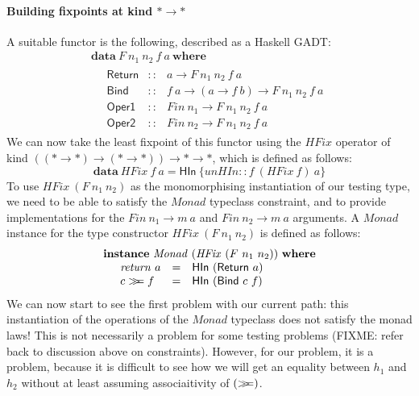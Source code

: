 \documentclass{llncs}
\newcommand{\mbind}{\mathrel{>\kern-0.45em>\kern-0.45em=}}
\begin{document}
\paragraph{Building fixpoints at kind $* \to *$} A suitable functor is
the following, described as a Haskell GADT:
\begin{displaymath}
  \begin{array}{l}
    \mathbf{data}~F~n_1~n_2~f~a~\mathbf{where} \\
    \quad
    \begin{array}{lcl}
      \mathsf{Return}&::&a \to F~n_1~n_2~f~a \\
      \mathsf{Bind}  &::&f~a \to (a \to f~b) \to F~n_1~n_2~f~a \\
      \mathsf{Oper1} &::&\mathit{Fin}~n_1 \to F~n_1~n_2~f~a \\
      \mathsf{Oper2} &::&\mathit{Fin}~n_2 \to F~n_1~n_2~f~a
    \end{array}
  \end{array}
\end{displaymath}
We can now take the least fixpoint of this functor using the
$\mathit{HFix}$ operator of kind
$((* \to *) \to (* \to *)) \to * \to *$, which is defined as follows:
\begin{displaymath}
  \mathbf{data}~\mathit{HFix}~f~a = \mathsf{HIn}~\{ \mathit{unHIn} :: f~(\mathit{HFix}~f)~a \}
\end{displaymath}
To use $\mathit{HFix}~(F~n_1~n_2)$ as the monomorphising instantiation
of our testing type, we need to be able to satisfy the
$\mathit{Monad}$ typeclass constraint, and to provide implementations
for the $\mathit{Fin}~n_1 \to m~a$ and $\mathit{Fin}~n_2 \to m~a$
arguments. A $\mathit{Monad}$ instance for the type constructor
$\mathit{HFix}~(F~n_1~n_2)$ is defined as follows:
\begin{displaymath}
  \begin{array}{l}
    \mathbf{instance}~\mathit{Monad}~(\mathit{HFix}~(F~n_1~n_2))~\mathbf{where} \\
    \quad
    \begin{array}{lcl}
      \mathit{return}~a &=& \mathsf{HIn}~(\mathsf{Return}~a) \\
      c \mbind f &=& \mathsf{HIn}~(\mathsf{Bind}~c~f)
    \end{array}
  \end{array}
\end{displaymath}
We can now start to see the first problem with our current path: this
instantiation of the operations of the $\mathit{Monad}$ typeclass does
not satisfy the monad laws! This is not necessarily a problem for some
testing problems (FIXME: refer back to discussion above on
constraints). However, for our problem, it is a problem, because it is
difficult to see how we will get an equality between $h_1$ and $h_2$
without at least assuming associaitivity of $(\mbind)$.
\end{document}
